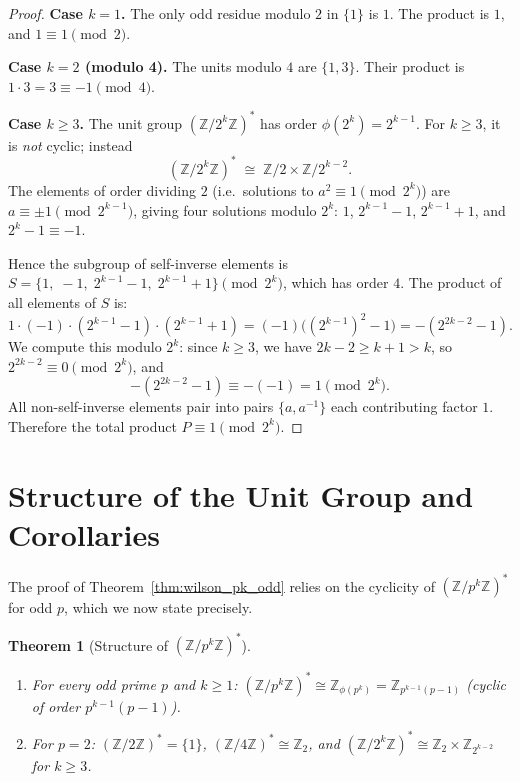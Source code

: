 \documentclass[12pt,a4paper]{amsart}
\newtheorem{theorem}{Theorem}[section]
\theoremstyle{definition}
\newcommand{\Z}{\mathbb{Z}}
\begin{document}
\begin{proof}
  \textbf{Case $k = 1$.}
  The only odd residue modulo $2$ in $\{1\}$ is $1$.  The product is $1$,
  and $1 \equiv 1 \pmod 2$.

  \textbf{Case $k = 2$ (modulo 4).}
  The units modulo $4$ are $\{1, 3\}$.  Their product is $1 \cdot 3 = 3 \equiv -1 \pmod 4$.

  \textbf{Case $k \geq 3$.}
  The unit group $(\Z/2^k\Z)^*$ has order $\phi(2^k) = 2^{k-1}$.
  For $k \geq 3$, it is \emph{not} cyclic; instead
  \[
    (\Z/2^k\Z)^* \;\cong\; \Z/2 \times \Z/2^{k-2}.
  \]
  The elements of order dividing $2$ (i.e.\ solutions to $a^2 \equiv 1 \pmod{2^k}$)
  are $a \equiv \pm 1 \pmod{2^{k-1}}$, giving four solutions modulo $2^k$:
  $1$, $2^{k-1}-1$, $2^{k-1}+1$, and $2^k - 1 \equiv -1$.

  Hence the subgroup of self-inverse elements is
  $S = \{1,\; -1,\; 2^{k-1}-1,\; 2^{k-1}+1\} \pmod{2^k}$,
  which has order $4$.  The product of all elements of $S$ is:
  \[
    1 \cdot (-1) \cdot (2^{k-1}-1) \cdot (2^{k-1}+1)
    = (-1)\bigl((2^{k-1})^2 - 1\bigr)
    = -(2^{2k-2} - 1).
  \]
  We compute this modulo $2^k$: since $k \geq 3$, we have $2k-2 \geq k+1 > k$,
  so $2^{2k-2} \equiv 0 \pmod{2^k}$, and
  \[
    -(2^{2k-2}-1) \equiv -(-1) = 1 \pmod{2^k}.
  \]
  All non-self-inverse elements pair into pairs $\{a, a^{-1}\}$ each
  contributing factor $1$.  Therefore the total product $P \equiv 1 \pmod{2^k}$.
\end{proof}

\section{Structure of the Unit Group and Corollaries}

The proof of Theorem~\ref{thm:wilson_pk_odd} relies on the cyclicity of
$(\Z/p^k\Z)^*$ for odd $p$, which we now state precisely.

\begin{theorem}[Structure of $(\Z/p^k\Z)^*$]\label{thm:structure}
  \begin{enumerate}
    \item[(a)] For every odd prime $p$ and $k \geq 1$:
      $(\Z/p^k\Z)^* \cong \Z_{\phi(p^k)} = \Z_{p^{k-1}(p-1)}$
      (cyclic of order $p^{k-1}(p-1)$).
    \item[(b)] For $p = 2$: $(\Z/2\Z)^* = \{1\}$, $(\Z/4\Z)^* \cong \Z_2$,
      and $(\Z/2^k\Z)^* \cong \Z_2 \times \Z_{2^{k-2}}$ for $k \geq 3$.
  \end{enumerate}
\end{theorem}
\end{document}
